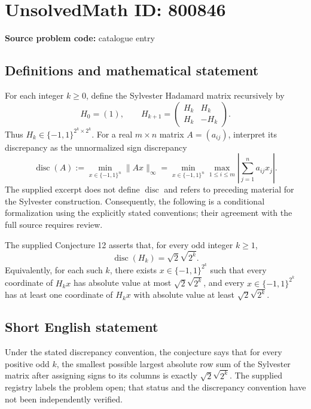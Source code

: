 \documentclass[11pt]{article}
\begin{document}
\section*{UnsolvedMath ID: 800846}
\textbf{Source problem code:} catalogue entry
\subsection{Definitions and mathematical statement}
For each integer \(k\geq 0\), define the Sylvester Hadamard matrix recursively by
\[
H_0=(1),\qquad H_{k+1}=\begin{pmatrix}H_k&H_k\\H_k&-H_k\end{pmatrix}.
\]
Thus \(H_k\in\{-1,1\}^{2^k\times 2^k}\). For a real \(m\times n\) matrix \(A=(a_{ij})\), interpret its discrepancy as the unnormalized sign discrepancy
\[
\operatorname{disc}(A):=\min_{x\in\{-1,1\}^n}\|Ax\|_\infty
=\min_{x\in\{-1,1\}^n}\max_{1\leq i\leq m}\left|\sum_{j=1}^n a_{ij}x_j\right|.
\]
The supplied excerpt does not define \(\operatorname{disc}\) and refers to preceding material for the Sylvester construction. Consequently, the following is a conditional formalization using the explicitly stated conventions; their agreement with the full source requires review.

The supplied Conjecture 12 asserts that, for every odd integer \(k\geq 1\),
\[
\operatorname{disc}(H_k)=\sqrt{2}\sqrt{2^k}.
\]
Equivalently, for each such \(k\), there exists \(x\in\{-1,1\}^{2^k}\) such that every coordinate of \(H_kx\) has absolute value at most \(\sqrt{2}\sqrt{2^k}\), and every \(x\in\{-1,1\}^{2^k}\) has at least one coordinate of \(H_kx\) with absolute value at least \(\sqrt{2}\sqrt{2^k}\).
\subsection{Short English statement}
Under the stated discrepancy convention, the conjecture says that for every positive odd \(k\), the smallest possible largest absolute row sum of the Sylvester matrix after assigning signs to its columns is exactly \(\sqrt{2}\sqrt{2^k}\). The supplied registry labels the problem open; that status and the discrepancy convention have not been independently verified.
\end{document}
